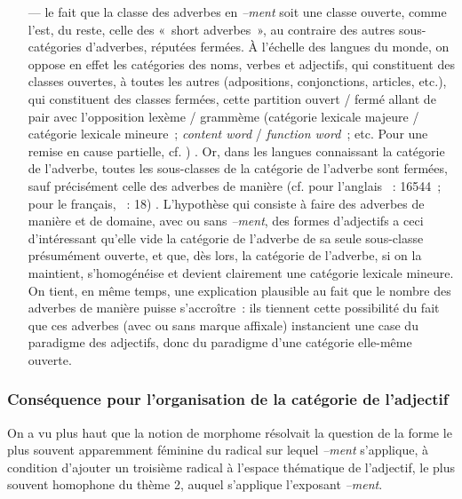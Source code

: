 \documentclass[output=paper]{langsci/langscibook}
\begin{document}
\begin{itemize}
\item[---] le fait que la classe des adverbes en \emph{--ment} soit une classe ouverte, comme l'est, du reste, celle des «~short adverbes~», au contraire des autres sous-catégories d'adverbes, réputées fermées. À l'échelle des langues du monde, on oppose en effet les catégories des noms, verbes et adjectifs, qui constituent des classes ouvertes, à toutes les autres (adpositions, conjonctions, articles, etc.), qui constituent des classes fermées, cette partition ouvert / fermé allant de pair avec l'opposition lexème / grammème %
(catégorie lexicale majeure / catégorie lexicale mineure~; \emph{content word} / \emph{function word~}; etc. Pour une remise en cause partielle, cf. %
\citealt{Croft00}%
%
)
%
. Or, dans les langues connaissant la catégorie de l'adverbe, toutes les sous-classes de la catégorie de l'adverbe sont fermées, sauf précisément celle des adverbes de manière %
(cf. pour l'anglais %
\citealt{Haspelmath01}%
%
~: 16544~; pour le français, %
\citealt{Fradin03}%
%
~: 18)
%
. L'hypothèse qui consiste à faire des adverbes de manière et de domaine, avec ou sans \emph{--ment}, des formes d'adjectifs a ceci d'intéressant qu'elle vide la catégorie de l'adverbe de sa seule sous-classe présumément ouverte, et que, dès lors, la catégorie de l'adverbe, si on la maintient, s'homogénéise et devient clairement une catégorie lexicale mineure. On tient, en même temps, une explication plausible au fait que le nombre des adverbes de manière puisse s'accroître~: ils tiennent cette possibilité du fait que ces adverbes (avec ou sans marque affixale) instancient une case du paradigme des adjectifs, donc du paradigme d'une catégorie elle-même ouverte.
\end{itemize}

\subsubsection{Conséquence pour l'organisation de la catégorie de l'adjectif}

On a vu plus haut que la notion de morphome résolvait la question de la forme le plus souvent apparemment féminine du radical sur lequel \emph{--ment} s'applique, à condition d'ajouter un troisième radical à l'espace thématique  de l'adjectif, le plus souvent homophone du thème 2, auquel s'applique l'exposant \emph{--ment}.
\end{document}
